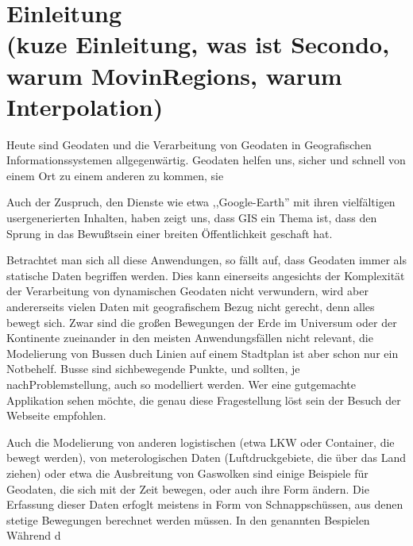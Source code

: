 
\chapter[Einleitung \anmerkung{ca. 5 Seiten}]{Einleitung\\
\normalsize{(kuze Einleitung, was ist Secondo, warum MovinRegions, warum Interpolation) }} \label{Kapitel1}

Heute sind Geodaten und die Verarbeitung von Geodaten in Geografischen Informationssystemen allgegenwärtig. Geodaten helfen uns, sicher und schnell von einem Ort zu einem anderen zu kommen, sie 

Auch der Zuspruch, den Dienste wie etwa ,,Google-Earth'' mit ihren vielfältigen usergenerierten Inhalten, haben zeigt uns, dass GIS ein Thema ist, dass den Sprung in das Bewußtsein einer breiten Öffentlichkeit geschaft hat. 

Betrachtet man sich all diese Anwendungen, so fällt auf, dass Geodaten immer als statische Daten begriffen werden. Dies kann einerseits angesichts der Komplexität der Verarbeitung von dynamischen Geodaten nicht verwundern, wird aber andererseits vielen Daten mit geografischem Bezug nicht gerecht, denn alles bewegt sich. Zwar sind die großen Bewegungen der Erde im Universum oder der Kontinente zueinander in den meisten Anwendungsfällen nicht relevant, die Modelierung von Bussen duch Linien auf einem Stadtplan ist aber schon nur ein Notbehelf. Busse sind sichbewegende Punkte, und sollten, je nachProblemstellung, auch so modelliert werden. Wer eine gutgemachte Applikation sehen möchte, die genau diese Fragestellung löst sein der Besuch der Webseite \cite{swR} empfohlen.

Auch die Modelierung von anderen logistischen (etwa LKW oder Container, die bewegt werden), von meterologischen Daten (Luftdruckgebiete, die über das Land ziehen) oder etwa die Ausbreitung von Gaswolken sind einige Beispiele für Geodaten, die sich mit der Zeit bewegen, oder auch ihre Form ändern. Die Erfassung dieser  Daten erfoglt meistens in Form von Schnappschüssen, aus denen stetige Bewegungen berechnet werden müssen. In den genannten Bespielen  Während d

